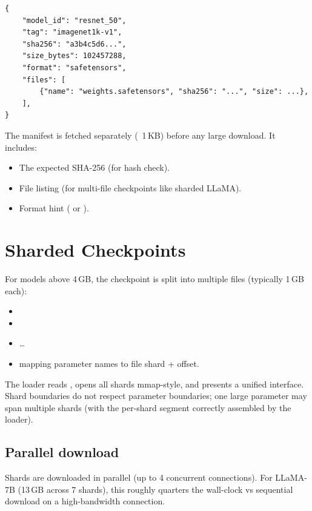 \begin{lstlisting}[style=lucid,language=LucidPython]
{
    "model_id": "resnet_50",
    "tag": "imagenet1k-v1",
    "sha256": "a3b4c5d6...",
    "size_bytes": 102457288,
    "format": "safetensors",
    "files": [
        {"name": "weights.safetensors", "sha256": "...", "size": ...},
    ],
}
\end{lstlisting}

The manifest is fetched separately (~1\,KB) before any large
download. It includes:
\begin{itemize}
  \item The expected SHA-256 (for hash check).
  \item File listing (for multi-file checkpoints like sharded
    LLaMA).
  \item Format hint ( or ).
\end{itemize}

\section{Sharded Checkpoints}
\label{sec:pretrained:sharded}

For models above 4\,GB, the checkpoint is split into multiple
files (typically 1\,GB each):

\begin{itemize}
  \item {}
  \item {}
  \item \dots
  \item {} mapping parameter names to file shard
    + offset.
\end{itemize}

The loader reads , opens all shards mmap-style,
and presents a unified  interface. Shard
boundaries do not respect parameter boundaries; one large
parameter may span multiple shards (with the per-shard segment
correctly assembled by the loader).

\subsection{Parallel download}
\label{ssec:pretrained:parallel_download}

Shards are downloaded in parallel (up to 4 concurrent
connections). For LLaMA-7B (13\,GB across 7 shards), this
roughly quarters the wall-clock vs sequential download on a
high-bandwidth connection.

